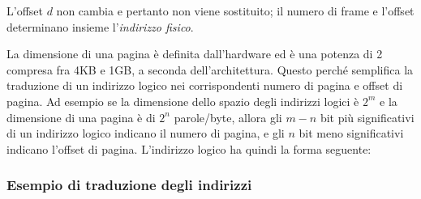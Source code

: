 \documentclass[a4paper,12pt, twoside]{report}
\begin{document}
L'offset $d$ non cambia e pertanto non viene sostituito; il numero di frame e l'offset determinano insieme l'\emph{indirizzo fisico}.

La dimensione di una pagina \`e definita dall'hardware ed \`e una potenza di 2 compresa fra 4KB e 1GB, a seconda dell'architettura. Questo perch\'e semplifica la traduzione di un indirizzo logico nei corrispondenti numero di pagina e
offset di pagina. Ad esempio se la dimensione dello spazio degli indirizzi logici \`e $2^m$ e la dimensione di una pagina
\`e di $2^n$ parole/byte, allora gli $m-n$ bit pi\`u significativi di un indirizzo logico indicano il numero di pagina, e gli
$n$ bit meno significativi indicano l'offset di pagina. L'indirizzo logico ha quindi la forma seguente:

\begin{center}
\end{center}

\subsubsection{Esempio di traduzione degli indirizzi}
\end{document}

